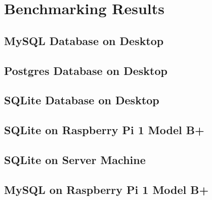 \chapter{Benchmarking Results}
	\label{appendix:benchmark}
	\section{MySQL Database on Desktop}
		

	\section{Postgres Database on Desktop}
		

	\section{SQLite Database on Desktop}
		

	\section{SQLite on Raspberry Pi 1 Model B+}
		

	\section{SQLite on Server Machine}
		

	\section{MySQL on Raspberry Pi 1 Model B+}
		
